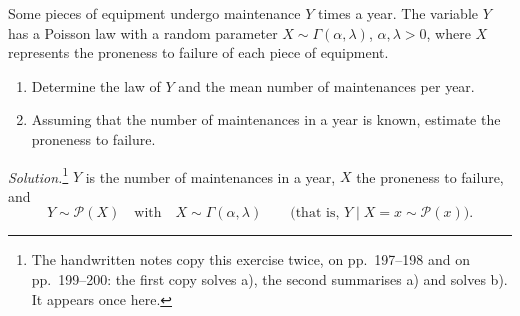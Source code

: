 \begin{example}\label{exa:cp-poisson-gamma}
Some pieces of equipment undergo maintenance $Y$ times a year. The variable $Y$ has a Poisson law
with a random parameter $X\sim\Gamma(\alpha,\lambda)$, $\alpha,\lambda>0$, where $X$ represents the
proneness to failure of each piece of equipment.
\begin{enumerate}[label=\alph*)]
  \item Determine the law of $Y$ and the mean number of maintenances per year.
  \item Assuming that the number of maintenances in a year is known, estimate the proneness to
    failure.
\end{enumerate}

\emph{Solution.}\footnote{The handwritten notes copy this exercise twice, on pp.~197--198 and on
pp.~199--200: the first copy solves a), the second summarises a) and solves b). It appears once
here.} $Y$ is the number of maintenances in a year, $X$ the proneness to failure, and
\[
  Y\sim\mathcal P(X)\quad\text{with}\quad X\sim\Gamma(\alpha,\lambda)\qquad\text{(that is, $Y\mid X=x\sim\mathcal P(x)$)}.
\]


\end{example}
